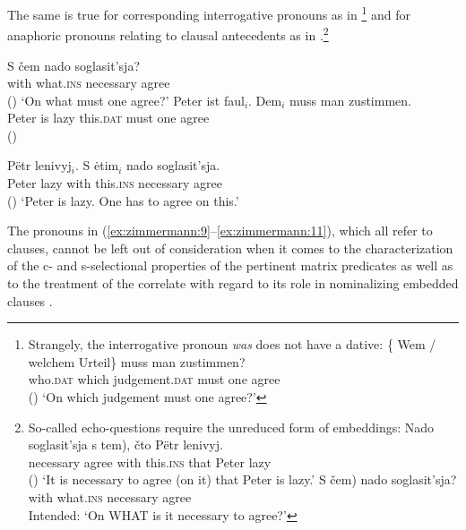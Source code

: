 \documentclass[output=paper]{langscibook}
\begin{document}
\noindent The same is true for corresponding interrogative pronouns as in \footnote{Strangely, the  interrogative pronoun \textit{was} does not have a dative:
                \ea\label{ex:zimmermann:footnote23}
                \gll \{\minsp{*} Wem / {welchem Urteil}\} muss man zustimmen? \\
                {} who.\textsc{dat} {} {which judgement}.\textsc{dat} must one agree \\ \hfill ()
                \glt `On which judgement must one agree?'
                \z}
and for anaphoric pronouns relating to clausal antecedents as in .\footnote{So-called echo-questions \citep[see][]{BeckReis2018} require the unreduced form of embeddings:
    \ea
        \ea \gll Nado soglasit'sja \minsp{(} s tem), čto Pëtr lenivyj.\\
        necessary agree {} with this.\textsc{ins} that Peter lazy\\ \hfill ()
        \glt `It is necessary to agree (on it) that Peter is lazy.'
        \ex \gll \minsp{*(} S čem) nado soglasit'sja?\\
        {} with what.\textsc{ins} necessary agree\\
        \glt Intended: `On WHAT is it necessary to agree?'
    \z\z
}

\ea\label{ex:zimmermann:10}
    \gll S čem nado soglasit'sja? \\
    with what.\textsc{ins} necessary agree\\ \hfill ()
    \glt `On what must one agree?'
\ex \label{ex:zimmermann:11}
    \ea\gll Peter ist faul$_i$. Dem$_i$ muss man zustimmen. \label{ex:zimmermann:11a} \\
    Peter is lazy this.\textsc{dat} must one agree\\ \hfill ()

    \ex\gll Pëtr lenivyj$_i$. S ėtim$_i$ nado soglasit'sja.  \label{ex:zimmermann:11b} \\
    Peter lazy with this.\textsc{ins} necessary agree\\ \hfill ()
\z
    \glt `Peter is lazy. One has to agree on this.'
\z

\noindent The pronouns in (\ref{ex:zimmermann:9}--\ref{ex:zimmermann:11}), which all refer to clauses, cannot be left out of consideration when it comes to the characterization of the c- and s-selectional properties of the pertinent matrix predicates as well as to the treatment of the correlate with regard to its role in nominalizing embedded clauses \citep[see][]{Zimmermann2019c}.
\end{document}
